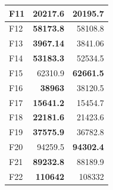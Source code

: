 \begin{table}[]
\begin{tabular}{lrr|}
\multicolumn{1}{|l|}{\cellcolor[HTML]{FCE6AB}F11} & \multicolumn{1}{r|}{\cellcolor[HTML]{D3FFB6}\textbf{20217.6}} & 20195.7                                                   \\ \hline
\multicolumn{1}{|l|}{\cellcolor[HTML]{FCE6AB}F12} & \multicolumn{1}{r|}{\cellcolor[HTML]{D3FFB6}\textbf{58173.8}} & 58108.8                                                   \\ \hline
\multicolumn{1}{|l|}{\cellcolor[HTML]{FCE6AB}F13} & \multicolumn{1}{r|}{\cellcolor[HTML]{D3FFB6}\textbf{3967.14}} & 3841.06                                                   \\ \hline
\multicolumn{1}{|l|}{\cellcolor[HTML]{FCE6AB}F14} & \multicolumn{1}{r|}{\cellcolor[HTML]{D3FFB6}\textbf{53183.3}} & 52534.5                                                   \\ \hline
\multicolumn{1}{|l|}{\cellcolor[HTML]{FCE6AB}F15} & \multicolumn{1}{r|}{62310.9}                                  & \cellcolor[HTML]{D3FFB6}\textbf{62661.5}                  \\ \hline
\multicolumn{1}{|l|}{\cellcolor[HTML]{FCE6AB}F16} & \multicolumn{1}{r|}{\cellcolor[HTML]{D3FFB6}\textbf{38963}}   & 38120.5                                                   \\ \hline
\multicolumn{1}{|l|}{\cellcolor[HTML]{FCE6AB}F17} & \multicolumn{1}{r|}{\cellcolor[HTML]{D3FFB6}\textbf{15641.2}} & 15454.7                                                   \\ \hline
\multicolumn{1}{|l|}{\cellcolor[HTML]{FCE6AB}F18} & \multicolumn{1}{r|}{\cellcolor[HTML]{D3FFB6}\textbf{22181.6}} & 21423.6                                                   \\ \hline
\multicolumn{1}{|l|}{\cellcolor[HTML]{FCE6AB}F19} & \multicolumn{1}{r|}{\cellcolor[HTML]{D3FFB6}\textbf{37575.9}} & 36782.8                                                   \\ \hline
\multicolumn{1}{|l|}{\cellcolor[HTML]{FCE6AB}F20} & \multicolumn{1}{r|}{94259.5}                                  & \cellcolor[HTML]{D3FFB6}\textbf{94302.4}                  \\ \hline
\multicolumn{1}{|l|}{\cellcolor[HTML]{FCE6AB}F21} & \multicolumn{1}{r|}{\cellcolor[HTML]{D3FFB6}\textbf{89232.8}} & 88189.9                                                   \\ \hline
\multicolumn{1}{|l|}{\cellcolor[HTML]{FCE6AB}F22} & \multicolumn{1}{r|}{\cellcolor[HTML]{D3FFB6}\textbf{110642}}  & 108332                                                    \\ \hline

\end{tabular}
\end{table}
